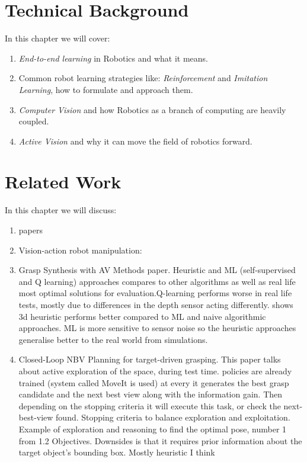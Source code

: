 \chapter{Technical Background}
  In this chapter we will cover:
  \begin{enumerate}
    \item \emph{End-to-end learning} in Robotics and what it means.
    \item Common robot learning strategies like: \emph{Reinforcement} and \emph{Imitation Learning}, how to formulate and approach them.
    \item \emph{Computer Vision} and how Robotics as a branch of computing are heavily coupled.
    \item \emph{Active Vision} and why it can move the field of robotics forward.
  \end{enumerate}


\chapter{Related Work}
  In this chapter we will discuss:
  \begin{enumerate}
    \item papers
    \item Vision-action robot manipulation:
    \item Grasp Synthesis with AV Methods paper. Heuristic and ML (self-supervised and Q learning) approaches compares to other algorithms as well as real life most optimal solutions for evaluation.Q-learning performs worse in real life tests, mostly due to differences in the depth sensor acting differently. shows 3d heuristic performs better compared to ML and naive algorithmic approaches. ML is more sensitive to sensor noise so the heuristic approaches generalise better to the real world from simulations.
    \item Closed-Loop NBV Planning for target-driven grasping. This paper talks about active exploration of the space, during test time. policies are already trained (system called MoveIt is used) at every it generates the best grasp candidate and the next best view along with the information gain. Then depending on the stopping criteria it will execute this task, or check the next-best-view found. Stopping criteria to balance exploration and exploitation. Example of exploration and reasoning to find the optimal pose, number 1 from 1.2 Objectives. Downsides is that it requires prior information about the target object's bounding box. Mostly heuristic I think
  \end{enumerate}


